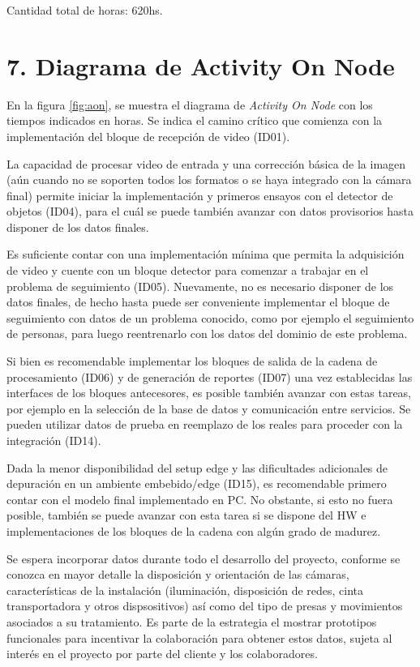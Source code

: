 \documentclass[11pt]{charter}
\begin{document}
Cantidad total de horas: 620hs.

\section{7. Diagrama de Activity On Node}
\label{sec:AoN}

En la figura \ref{fig:aon}, se muestra el diagrama de {\em Activity On Node} con los tiempos indicados en horas. Se indica el camino crítico que comienza con la implementación del bloque de recepción de video (ID01). 

La capacidad de procesar video de entrada y una corrección básica de la imagen (aún cuando no se soporten todos los formatos o se haya integrado con la cámara final) permite iniciar la implementación y primeros ensayos con el detector de objetos (ID04), para el cuál se puede también avanzar con datos provisorios hasta disponer de los datos finales.

Es suficiente contar con una implementación mínima que permita la adquisición de video y cuente con un bloque detector para comenzar a trabajar en el problema de seguimiento (ID05). Nuevamente, no es necesario disponer de los datos finales, de hecho hasta puede ser conveniente implementar el bloque de seguimiento con datos de un problema conocido, como por ejemplo el seguimiento de personas, para luego reentrenarlo con los datos del dominio de este problema.

Si bien es recomendable implementar los bloques de salida de la cadena de procesamiento (ID06) y de generación de reportes (ID07) una vez establecidas las interfaces de los bloques antecesores, es posible también avanzar con estas tareas, por ejemplo en la selección de la base de datos y comunicación entre servicios. Se pueden utilizar datos de prueba en reemplazo de los reales para proceder con la integración (ID14).

Dada la menor disponibilidad del setup edge y las dificultades adicionales de depuración en un ambiente embebido/edge (ID15), es recomendable primero contar con el modelo final implementado en PC. No obstante, si esto no fuera posible, también se puede avanzar con esta tarea si se dispone del HW e implementaciones de los bloques de la cadena con algún grado de madurez.

Se espera incorporar datos durante todo el desarrollo del proyecto, conforme se conozca en mayor detalle la disposición y orientación de las cámaras, características de la instalación (iluminación, disposición de redes, cinta transportadora y otros dispsositivos) así como del tipo de presas y movimientos asociados a su tratamiento. Es parte de la estrategia el mostrar prototipos funcionales para incentivar la colaboración para obtener estos datos, sujeta al interés en el proyecto por parte del cliente y los colaboradores.
\end{document}
